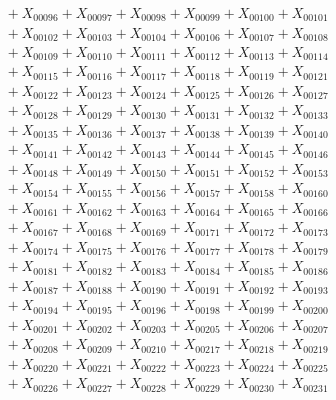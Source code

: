 \documentclass[a4paper,10pt]{article}
\begin{document}
{\begin{align}
&\quad  + X_{00096} + X_{00097} + X_{00098} + X_{00099} + X_{00100} + X_{00101} \\[0.5ex]
&\quad  + X_{00102} + X_{00103} + X_{00104} + X_{00106} + X_{00107} + X_{00108} \\[0.5ex]
&\quad  + X_{00109} + X_{00110} + X_{00111} + X_{00112} + X_{00113} + X_{00114} \\[0.5ex]
&\quad  + X_{00115} + X_{00116} + X_{00117} + X_{00118} + X_{00119} + X_{00121} \\[0.5ex]
&\quad  + X_{00122} + X_{00123} + X_{00124} + X_{00125} + X_{00126} + X_{00127} \\[0.5ex]
&\quad  + X_{00128} + X_{00129} + X_{00130} + X_{00131} + X_{00132} + X_{00133} \\[0.5ex]
&\quad  + X_{00135} + X_{00136} + X_{00137} + X_{00138} + X_{00139} + X_{00140} \\[0.5ex]
&\quad  + X_{00141} + X_{00142} + X_{00143} + X_{00144} + X_{00145} + X_{00146} \\[0.5ex]
&\quad  + X_{00148} + X_{00149} + X_{00150} + X_{00151} + X_{00152} + X_{00153} \\[0.5ex]
&\quad  + X_{00154} + X_{00155} + X_{00156} + X_{00157} + X_{00158} + X_{00160} \\[0.5ex]
&\quad  + X_{00161} + X_{00162} + X_{00163} + X_{00164} + X_{00165} + X_{00166} \\[0.5ex]
&\quad  + X_{00167} + X_{00168} + X_{00169} + X_{00171} + X_{00172} + X_{00173} \\[0.5ex]
&\quad  + X_{00174} + X_{00175} + X_{00176} + X_{00177} + X_{00178} + X_{00179} \\[0.5ex]
&\quad  + X_{00181} + X_{00182} + X_{00183} + X_{00184} + X_{00185} + X_{00186} \\[0.5ex]
&\quad  + X_{00187} + X_{00188} + X_{00190} + X_{00191} + X_{00192} + X_{00193} \\[0.5ex]
&\quad  + X_{00194} + X_{00195} + X_{00196} + X_{00198} + X_{00199} + X_{00200} \\[0.5ex]
&\quad  + X_{00201} + X_{00202} + X_{00203} + X_{00205} + X_{00206} + X_{00207} \\[0.5ex]
&\quad  + X_{00208} + X_{00209} + X_{00210} + X_{00217} + X_{00218} + X_{00219} \\[0.5ex]
&\quad  + X_{00220} + X_{00221} + X_{00222} + X_{00223} + X_{00224} + X_{00225} \\[0.5ex]
&\quad  + X_{00226} + X_{00227} + X_{00228} + X_{00229} + X_{00230} + X_{00231} \\[0.5ex]

\end{align}}
\end{document}
